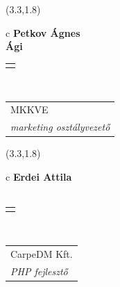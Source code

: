 \documentclass[11pt]{article}
\begin{document}
\makebox(3.3,1.8){
  \renewcommand\arraystretch{1.3}
  \begin{tabular}[c]{c}
    \hspace{8.5mm}
    \LARGE\bf{ Petkov Ágnes }\\
    \hspace{8.5mm}
    \Large{ Ági }\\
    \renewcommand\arraystretch{3}
    \begin{tabular}[c]{c}
      \centering
      \fontfamily{phv}\selectfont{
        \textbf{
          \textsc{
            \scriptsize{
            \color{Dark}{ Ismerkedő }\color{Bright}{ Webmester }\color{Bright}{ Sminkmester }\color{Bright}{ Programozó }
            }
          }
        }
      }
    \end{tabular}
    \\
    \renewcommand\arraystretch{1}
    \begin{tabular}{p{3.3in}}
      \hspace{.7cm}MKKVE\\
      \hspace{.7cm}\emph{ marketing osztályvezető }\\
    \end{tabular}
  \end{tabular}
}

\makebox(3.3,1.8){
  \renewcommand\arraystretch{1.3}
  \begin{tabular}[c]{c}
    \hspace{8.5mm}
    \LARGE\bf{ Erdei Attila }\\
    \hspace{8.5mm}
    \Large{  }\\
    \renewcommand\arraystretch{3}
    \begin{tabular}[c]{c}
      \centering
      \fontfamily{phv}\selectfont{
        \textbf{
          \textsc{
            \scriptsize{
            \color{Bright}{ Ismerkedő }\color{Bright}{ Webmester }\color{Bright}{ Sminkmester }\color{Dark}{ Programozó }
            }
          }
        }
      }
    \end{tabular}
    \\
    \renewcommand\arraystretch{1}
    \begin{tabular}{p{3.3in}}
      \hspace{.7cm}CarpeDM Kft.\\
      \hspace{.7cm}\emph{ PHP fejlesztő }\\
    \end{tabular}
  \end{tabular}
}
\end{document}
